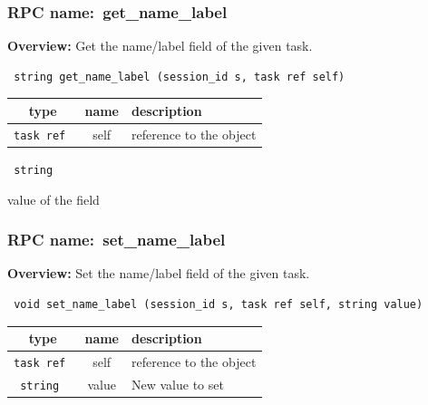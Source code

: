 \subsubsection{RPC name:~get\_name\_label}

{\bf Overview:} 
Get the name/label field of the given task.

\begin{verbatim} string get_name_label (session_id s, task ref self)\end{verbatim}



 
\vspace{0.3cm}
\begin{tabular}{|c|c|p{7cm}|}
 \hline
{\bf type} & {\bf name} & {\bf description} \\ \hline
{\tt task ref } & self & reference to the object \\ \hline 

\end{tabular}

\vspace{0.3cm}

{\tt 
string
}


value of the field
\vspace{0.3cm}
\vspace{0.3cm}
\vspace{0.3cm}
\subsubsection{RPC name:~set\_name\_label}

{\bf Overview:} 
Set the name/label field of the given task.

\begin{verbatim} void set_name_label (session_id s, task ref self, string value)\end{verbatim}



 
\vspace{0.3cm}
\begin{tabular}{|c|c|p{7cm}|}
 \hline
{\bf type} & {\bf name} & {\bf description} \\ \hline
{\tt task ref } & self & reference to the object \\ \hline 

{\tt string } & value & New value to set \\ \hline 

\end{tabular}


